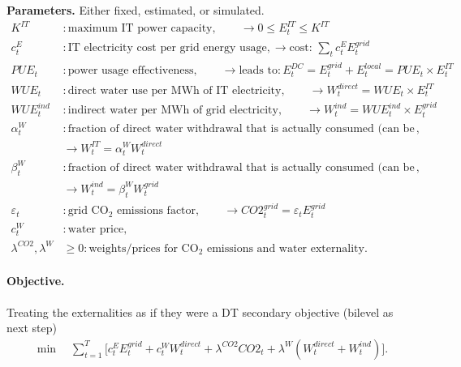 \documentclass{article}
\begin{document}
\textbf{Parameters.} Either fixed, estimated, or simulated.
\begin{align*}
    K^{IT}&: \text{maximum IT power capacity}, \qquad \rightarrow 0 \leq 
    E_t^{IT} \leq K^{IT}\\
     c_t^E&: \text{IT electricity cost per grid energy usage}, \rightarrow \text{cost: } \sum_t c^E_t E_t^{grid} \\
    PUE_t&: \text{power usage effectiveness}, \qquad \rightarrow \text{leads to}: E_t^{DC}=E_t^{grid} + E_t^{local} = PUE_t \times E_t^{IT}\\
    WUE_t &: \text{direct water use per MWh of IT electricity}, \qquad \rightarrow W_t^{direct} = WUE_t\times E_t^{IT}\\
    WUE_t^{ind}&: \text{indirect water per MWh of grid electricity}, \qquad \rightarrow  W_t^{ind} = WUE_t^{ind}\times E_t^{grid} \\
    \alpha_t^W &: \text{fraction of direct water withdrawal that is actually consumed (can be a factor)},\\
    & \rightarrow W_t^{IT} = \alpha_t^W  W_t^{direct}\\
\beta_t^W &: \text{fraction of direct water withdrawal that is actually consumed (can be a factor)},\\
    & \rightarrow W_t^{ind} = \beta_t^W  W_t^{grid}\\
    \varepsilon_t &: \text{grid CO$_2$ emissions factor}, \qquad \rightarrow CO2_t^{grid} =  \varepsilon_t E_t^{grid} \\%
    c_t^W&: \text{water price},%
    \\ 
    \lambda^{CO2},\lambda^W &\geq 0:
     \text{weights/prices for CO$_2$ emissions and water externality}.
\end{align*}


\paragraph{Objective.} Treating the externalities as if they were a DT secondary objective (bilevel as next step)
\begin{align*}
\min \quad
    \sum_{t=1}^T \Bigg[
        c_t^E E_t^{grid}
        + c_t^W W_t^{direct}
        + \lambda^{CO2} CO2_t
        + \lambda^W (W_t^{direct} + W_t^{ind})
    \Bigg].
\end{align*}
\end{document}
